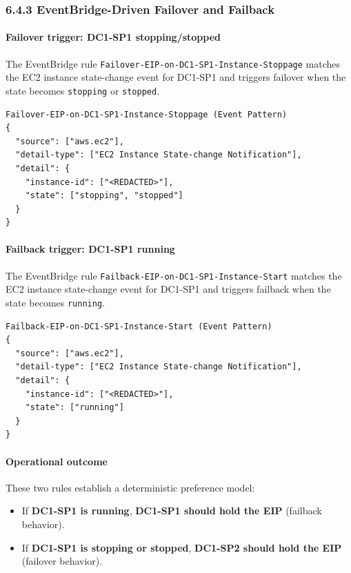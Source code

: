 \documentclass[11pt]{article}
\begin{document}
\subsubsection{6.4.3 EventBridge-Driven Failover and Failback}

\paragraph{Failover trigger: DC1-SP1 stopping/stopped}
The EventBridge rule \texttt{Failover-EIP-on-DC1-SP1-Instance-Stoppage} matches the EC2 instance state-change event for DC1-SP1 and triggers failover when the state becomes \texttt{stopping} or \texttt{stopped}.

\begin{verbatim}
Failover-EIP-on-DC1-SP1-Instance-Stoppage (Event Pattern)
{
  "source": ["aws.ec2"],
  "detail-type": ["EC2 Instance State-change Notification"],
  "detail": {
    "instance-id": ["<REDACTED>"],
    "state": ["stopping", "stopped"]
  }
}
\end{verbatim}

\paragraph{Failback trigger: DC1-SP1 running}
The EventBridge rule \texttt{Failback-EIP-on-DC1-SP1-Instance-Start} matches the EC2 instance state-change event for DC1-SP1 and triggers failback when the state becomes \texttt{running}.

\begin{verbatim}
Failback-EIP-on-DC1-SP1-Instance-Start (Event Pattern)
{
  "source": ["aws.ec2"],
  "detail-type": ["EC2 Instance State-change Notification"],
  "detail": {
    "instance-id": ["<REDACTED>"],
    "state": ["running"]
  }
}
\end{verbatim}

\paragraph{Operational outcome}
These two rules establish a deterministic preference model:
\begin{itemize}
  \item If \textbf{DC1-SP1 is running}, \textbf{DC1-SP1 should hold the EIP} (failback behavior).
  \item If \textbf{DC1-SP1 is stopping or stopped}, \textbf{DC1-SP2 should hold the EIP} (failover behavior).
\end{itemize}
\end{document}
